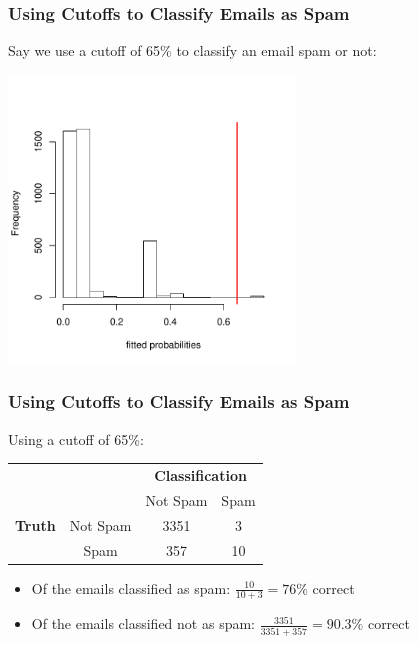 \documentclass[handout]{beamer}
\newcommand{\blue}[1]{\textcolor{blue2}{#1}}
\begin{document}
\begin{frame}[fragile]
\frametitle{Using Cutoffs to Classify Emails as Spam}

Say we use a cutoff of 65\% to \blue{classify} an email spam or not:
\begin{center}
\includegraphics[width=3in]{figure/fitted2.pdf}
\end{center}

\end{frame}


\begin{frame}[fragile]
\frametitle{Using Cutoffs to Classify Emails as Spam}

Using a cutoff of 65\%:
\begin{center}
  \begin{tabular}{cc|cc}
     \multicolumn{2}{c}{}  & \multicolumn{2}{c}{\textbf{Classification}} \\ 
     &  & Not Spam & Spam \\ 
\hline
    \textbf{Truth} & Not Spam & 3351 & 3\\
     & Spam & 357 & 10\\ 
    \hline
  \end{tabular}
\end{center}
%
%
\pause
\begin{itemize}
\item Of the emails classified as spam:  $\frac{10}{10+3} = 76\%$ correct
\item Of the emails classified not as spam:  $\frac{3351}{3351+357} = 90.3\%$ correct
\end{itemize}


\end{frame}
\end{document}
